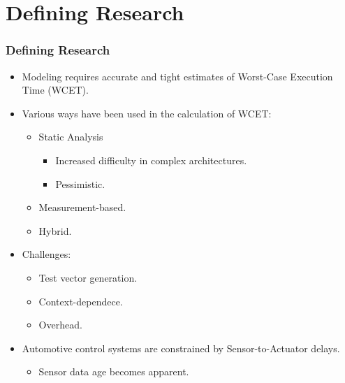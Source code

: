 \documentclass{beamer}
\begin{document}
\section{Defining Research}
\begin{frame}
    \frametitle{Defining Research}
    \begin{itemize}
        \item Modeling requires accurate and tight estimates
            of Worst-Case Execution Time (WCET).
            \nocite{gustafsson2010malardalen}
            \nocite{schlatow2018data}
        \item Various ways have been used in the calculation of WCET:
            \begin{itemize}
                \item Static Analysis
                    \begin{itemize}
                        \item Increased difficulty in complex architectures.
                        \item Pessimistic.
                    \end{itemize}
                \item Measurement-based.
                \item Hybrid.
            \end{itemize}
        \item Challenges:
            \begin{itemize}
                \item Test vector generation.
                \item Context-dependece.
                \item Overhead.
            \end{itemize}
        \item Automotive control systems are constrained by Sensor-to-Actuator
            delays.
            \begin{itemize}
                \item Sensor data age becomes apparent.
            \end{itemize}
    \end{itemize}
    \nocite{shah2014measurement}
    \nocite{bunte2011let}
\end{frame}
\end{document}
